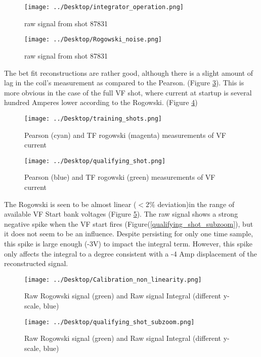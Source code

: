 \documentclass{article}
\begin{document}
\begin{large}
\begin{figure}[h!]
\centering
\texttt{[image: ../Desktop/integrator\_operation.png]}\caption{raw signal from shot 87831}
\label{raw_sigs}
\end{figure}
\begin{figure}[h!]
\centering
\texttt{[image: ../Desktop/Rogowski\_noise.png]}\caption{raw signal from shot 87831}
\label{noise}
\end{figure}

\newpage
\par
The bet fit reconstructions are rather good, although there is a slight amount of lag in the coil's measurement as compared to the Pearson. (Figure \ref{training_shots}). This is more obvious in the case of the full VF shot, where current at startup is several hundred Amperes lower according to the Rogowski. (Figure \ref{qualifying_shot}) 
\begin{figure}[h!]
\centering
\texttt{[image: ../Desktop/training\_shots.png]}\caption{Pearson (cyan) and TF rogowski (magenta) measurements of VF current}
\label{training_shots}
\end{figure}
\begin{figure}[h!]
\centering
\texttt{[image: ../Desktop/qualifying\_shot.png]}\caption{Pearson (blue) and TF rogowski (green) measurements of VF current}
\label{qualifying_shot}
\end{figure}
\newpage
\par
The Rogowski is seen to be almost linear ($<2\%$ deviation)in the range of available VF Start bank voltages (Figure \ref{calibration_nonlinearity}). The raw signal shows a strong negative spike when the VF start fires (Figure(\ref{qualifying_shot_subzoom}), but it does not seem to be an influence.  Despite persisting for only one time sample, this spike is large enough (-3V) to impact the integral term.  However, this spike only affects the integral to a degree consistent with a -4 Amp displacement of the reconstructed signal.
\begin{figure}[h!]
\centering
\texttt{[image: ../Desktop/Calibration\_non\_linearity.png]}\caption{Raw Rogowski signal (green) and Raw signal Integral (different y-scale, blue)}
\label{calibration_nonlinearity}
\end{figure}
\begin{figure}[h!]
\centering
\texttt{[image: ../Desktop/qualifying\_shot\_subzoom.png]}\caption{Raw Rogowski signal (green) and Raw signal Integral (different y-scale, blue)}

\end{figure}
\end{large}
\end{document}
